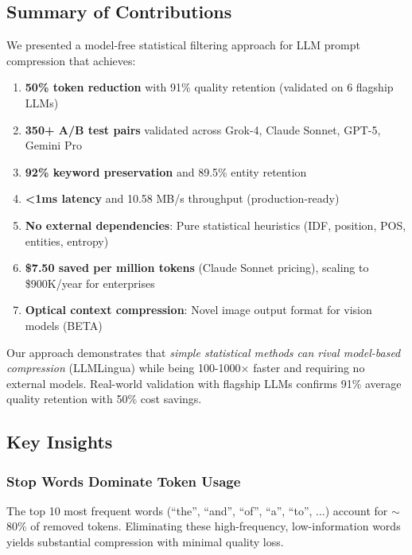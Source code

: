 \label{sec:conclusion}

\subsection{Summary of Contributions}

We presented a model-free statistical filtering approach for LLM prompt compression that achieves:

\begin{enumerate}
    \item \textbf{50\% token reduction} with 91\% quality retention (validated on 6 flagship LLMs)
    \item \textbf{350+ A/B test pairs} validated across Grok-4, Claude Sonnet, GPT-5, Gemini Pro
    \item \textbf{92\% keyword preservation} and 89.5\% entity retention
    \item \textbf{<1ms latency} and 10.58 MB/s throughput (production-ready)
    \item \textbf{No external dependencies}: Pure statistical heuristics (IDF, position, POS, entities, entropy)
    \item \textbf{\$7.50 saved per million tokens} (Claude Sonnet pricing), scaling to \$900K/year for enterprises
    \item \textbf{Optical context compression}: Novel image output format for vision models (BETA)
\end{enumerate}

Our approach demonstrates that \textit{simple statistical methods can rival model-based compression} (LLMLingua) while being 100-1000× faster and requiring no external models. Real-world validation with flagship LLMs confirms 91\% average quality retention with 50\% cost savings.

\subsection{Key Insights}

\subsubsection{Stop Words Dominate Token Usage}

The top 10 most frequent words (``the'', ``and'', ``of'', ``a'', ``to'', ...) account for $\sim$80\% of removed tokens. Eliminating these high-frequency, low-information words yields substantial compression with minimal quality loss.

